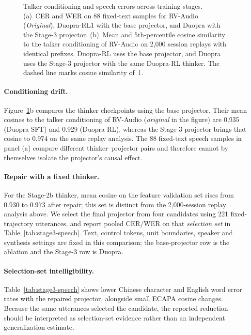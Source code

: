\begin{figure}[t]
\centering
{}
\caption{Talker conditioning and speech errors across training stages. (a)~CER and WER on 88 fixed-text samples for RV-Audio
(\textit{Original}), Duopra-RL1 with the base projector, and Duopra
with the Stage-3 projector.
(b)~Mean and 5th-percentile cosine similarity to the talker conditioning
of RV-Audio on 2,000 session replays with
identical prefixes. Duopra-RL uses the base projector, and Duopra uses
the Stage-3 projector with the same Duopra-RL thinker.
The dashed line marks cosine similarity of~1.}
\label{fig:projector}
\end{figure}





\paragraph{Conditioning drift.}
Figure~\ref{fig:projector}b compares the thinker checkpoints using the base projector. Their mean cosines to the talker conditioning of RV-Audio (\textit{original} in the figure) are 0.935 (Duopra-SFT) and 0.929 (Duopra-RL), whereas the Stage-3 projector brings that cosine to 0.974 on the same replay analysis. The 88 fixed-text speech samples in panel (a) compare different thinker--projector pairs and therefore cannot by themselves isolate the projector's causal effect.

\paragraph{Repair with a fixed thinker.}
For the Stage-2b thinker, mean cosine on the feature validation set rises from 0.930 to 0.973 after repair; this set is distinct from the 2,000-session replay analysis above. We select the final projector from four candidates using 221 fixed-trajectory utterances, and report pooled CER/WER on that \emph{selection set} in Table~\ref{tab:stage3-speech}. Text, control tokens, unit boundaries, speaker and synthesis settings are fixed in this comparison; the base-projector row is the ablation and the Stage-3 row is Duopra.



\paragraph{Selection-set intelligibility.}
Table~\ref{tab:stage3-speech} shows lower Chinese character and English word error rates with the repaired projector, alongside small ECAPA cosine changes. Because the same utterances selected the candidate, the reported reduction should be interpreted as selection-set evidence rather than an independent generalization estimate.

